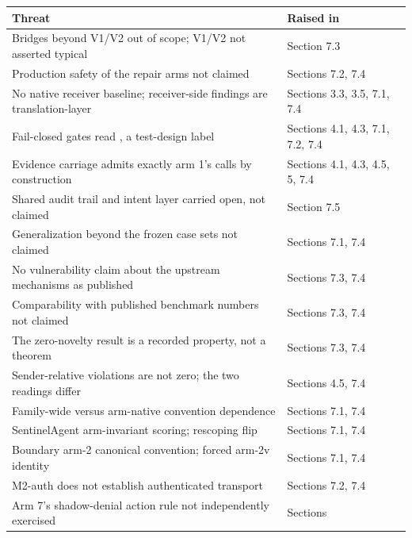 \documentclass[
  10pt,
]{article}
\newcounter{none} %
\let\origtexttt\texttt
\renewcommand{\texttt}[1]{{\upshape\origtexttt{#1}}}
\renewcommand{\_}{\allowbreak\origunderscore}
\begin{document}
{\def\LTcaptype{none} %
\begin{longtable}[]{@{}
  >{\raggedright\arraybackslash}p{}
  >{\raggedright\arraybackslash}p{}@{}}
\toprule\noalign{}
\begin{minipage}[b]{\linewidth}\raggedright
Threat
\end{minipage} & \begin{minipage}[b]{\linewidth}\raggedright
Raised in
\end{minipage} \\
\midrule\noalign{}
\endhead
\bottomrule\noalign{}
\endlastfoot
Bridges beyond V1/V2 out of scope; V1/V2 not asserted typical & Section
7.3 \\
Production safety of the repair arms not claimed & Sections 7.2, 7.4 \\
No native receiver baseline; receiver-side findings are
translation-layer & Sections 3.3, 3.5, 7.1, 7.4 \\
Fail-closed gates read \texttt{case.exercised\_aspects}, a test-design
label & Sections 4.1, 4.3, 7.1, 7.2, 7.4 \\
Evidence carriage admits exactly arm 1's calls by construction &
Sections 4.1, 4.3, 4.5, 5, 7.4 \\
Shared audit trail and intent layer carried open, not claimed & Section
7.5 \\
Generalization beyond the frozen case sets not claimed & Sections 7.1,
7.4 \\
No vulnerability claim about the upstream mechanisms as published &
Sections 7.3, 7.4 \\
Comparability with published benchmark numbers not claimed & Sections
7.3, 7.4 \\
The zero-novelty result is a recorded property, not a theorem & Sections
7.3, 7.4 \\
Sender-relative violations are not zero; the two readings differ &
Sections 4.5, 7.4 \\
Family-wide versus arm-native convention dependence & Sections 7.1,
7.4 \\
SentinelAgent arm-invariant scoring; rescoping flip & Sections 7.1,
7.4 \\
Boundary arm-2 canonical convention; forced arm-2v identity & Sections
7.1, 7.4 \\
M2-auth does not establish authenticated transport & Sections 7.2,
7.4 \\
Arm 7's shadow-denial action rule not independently exercised & Sections

\end{longtable}}
\end{document}
